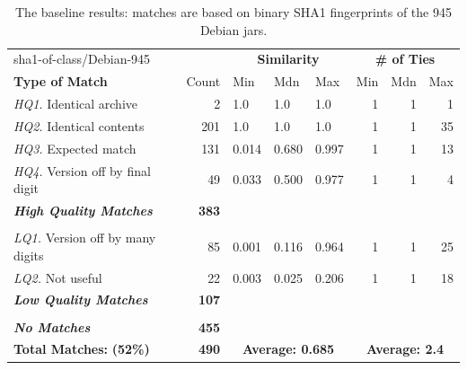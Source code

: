 \begin{table}[h]
  \centering
\begin{tabular}[htbp]{l|r|lll|rrr}
  sha1-of-class/Debian-945   &              & \multicolumn{3}{c|}{\textbf{Similarity}}  & \multicolumn{3}{c}{\textbf{\# of Ties}} \\
  \textbf{Type of Match}     & Count        & Min   & Mdn    & Max   & Min  & Mdn  & Max  \\
\hline
  \emph{HQ1.} Identical archive          &   2          & 1.0   & 1.0    & 1.0   & 1    & 1    &  1   \\
  \emph{HQ2.} Identical contents         & 201          & 1.0   & 1.0    & 1.0   & 1    & 1    & 35   \\
  \emph{HQ3.} Expected match             & 131          & 0.014 & 0.680  & 0.997 & 1    & 1    & 13   \\
  \emph{HQ4.} Version off by final digit &  49          & 0.033 & 0.500  & 0.977 & 1    & 1    &  4   \\
  \emph{\textbf{High Quality Matches}}   & \textbf{383} &       &        &       &      &      &      \\
& & & & & & & \\
  \emph{LQ1.} Version off by many digits &  85          & 0.001 & 0.116  & 0.964 & 1    & 1    & 25   \\
  \emph{LQ2.} Not useful                 &  22          & 0.003 & 0.025  & 0.206 & 1    & 1    & 18   \\
  \emph{\textbf{Low Quality Matches}}    & \textbf{107} &       &        &       &      &      &      \\
& & & & & & & \\
  \emph{\textbf{No Matches}}             & \textbf{455} &       &        &       &      &      &     \\
\hline
  \textbf{Total Matches:} \hspace{3em} \textbf{(52\%)} & \textbf{490}   & \multicolumn{3}{c|}{\textbf{Average: 0.685}}  & \multicolumn{3}{c}{\textbf{Average: 2.4}} \\
\end{tabular}
  \caption{The baseline results:  matches are based on binary SHA1 fingerprints of the 945 Debian jars.}
  \label{tab:debianSha1OfClass}
\end{table}


